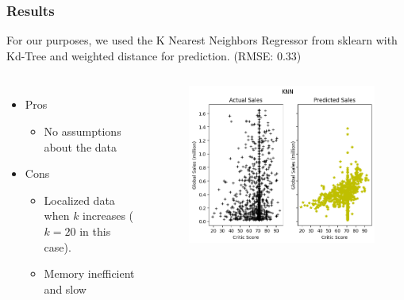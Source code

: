 \begin{frame}[fragile]
    \frametitle{Results}
    For our purposes, we used the K Nearest Neighbors Regressor from sklearn with Kd-Tree and weighted distance for prediction. (RMSE: 0.33)
    \begin{columns}
        \begin{itemize}
            \item Pros
            \begin{itemize}
                \item No assumptions about the data
            \end{itemize}
            \item Cons
            \begin{itemize}
                \item Localized data when $k$ increases ($k = 20$ in this case).
                \item Memory inefficient and slow
            \end{itemize}
        \end{itemize}
        \begin{figure}
            \centering
            \includegraphics[scale=0.45]{graphs/knn.png}
        \end{figure}
    \end{columns}
\end{frame}